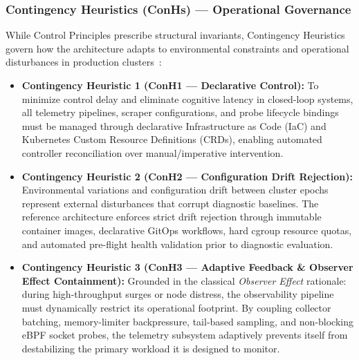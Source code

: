 \subsubsection{Contingency Heuristics (ConHs) — Operational Governance}
While Control Principles prescribe structural invariants, Contingency Heuristics govern how the architecture adapts to environmental constraints and operational disturbances in production clusters~\cite{walls_1992, wieringa_2014}:
\begin{itemize}[leftmargin=1.2em, itemsep=2pt, topsep=3pt]
    \item \textbf{Contingency Heuristic 1 (ConH1 — Declarative Control):} To minimize control delay and eliminate cognitive latency in closed-loop systems, all telemetry pipelines, scraper configurations, and probe lifecycle bindings must be managed through declarative Infrastructure as Code (IaC) and Kubernetes Custom Resource Definitions (CRDs), enabling automated controller reconciliation over manual/imperative intervention.
    \item \textbf{Contingency Heuristic 2 (ConH2 — Configuration Drift Rejection):} Environmental variations and configuration drift between cluster epochs represent external disturbances that corrupt diagnostic baselines. The reference architecture enforces strict drift rejection through immutable container images, declarative GitOps workflows, hard cgroup resource quotas, and automated pre-flight health validation prior to diagnostic evaluation.
    \item \textbf{Contingency Heuristic 3 (ConH3 — Adaptive Feedback \& Observer Effect Containment):} Grounded in the classical \textit{Observer Effect} rationale: during high-throughput surges or node distress, the observability pipeline must dynamically restrict its operational footprint. By coupling collector batching, memory-limiter backpressure, tail-based sampling, and non-blocking eBPF socket probes, the telemetry subsystem adaptively prevents itself from destabilizing the primary workload it is designed to monitor.
\end{itemize}
